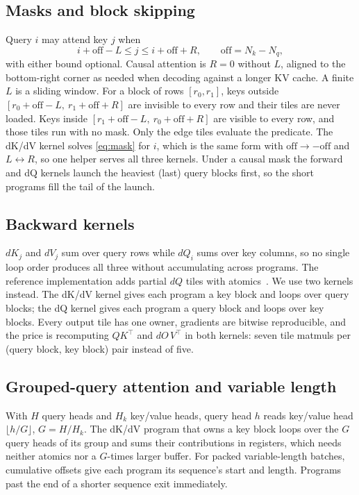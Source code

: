 \documentclass[10pt,twocolumn,letterpaper]{article}
\begin{document}
\subsection{Masks and block skipping}
Query $i$ may attend key $j$ when
\begin{equation}
i + \mathrm{off} - L \le j \le i + \mathrm{off} + R, \qquad \mathrm{off} = N_k - N_q,
\label{eq:mask}
\end{equation}
with either bound optional. Causal attention is $R = 0$ without $L$, aligned
to the bottom-right corner as needed when decoding against a longer KV cache.
A finite $L$ is a sliding window. For a block of rows $[r_0, r_1]$, keys
outside $[r_0 + \mathrm{off} - L,\ r_1 + \mathrm{off} + R]$ are invisible to
every row and their tiles are never loaded. Keys inside
$[r_1 + \mathrm{off} - L,\ r_0 + \mathrm{off} + R]$ are visible to every row,
and those tiles run with no mask. Only the edge tiles evaluate the predicate.
The dK/dV kernel solves \cref{eq:mask} for $i$, which is the same form with
$\mathrm{off} \to -\mathrm{off}$ and $L \leftrightarrow R$, so one helper
serves all three kernels. Under a causal mask the forward and dQ kernels
launch the heaviest (last) query blocks first, so the short programs fill the
tail of the launch.

\subsection{Backward kernels}
$dK_j$ and $dV_j$ sum over query rows while $dQ_i$ sums over key columns, so
no single loop order produces all three without accumulating across programs.
The reference implementation adds partial $dQ$ tiles with
atomics~\cite{dao2024flashattention2}. We use two kernels instead. The dK/dV
kernel gives each program a key block and loops over query blocks; the dQ
kernel gives each program a query block and loops over key blocks. Every
output tile has one owner, gradients are bitwise reproducible, and the price
is recomputing $QK^\top$ and $dO\,V^\top$ in both kernels: seven tile matmuls
per (query block, key block) pair instead of five.

\subsection{Grouped-query attention and variable length}
With $H$ query heads and $H_k$ key/value heads, query head $h$ reads
key/value head $\lfloor h / G \rfloor$, $G = H/H_k$. The dK/dV program that
owns a key block loops over the $G$ query heads of its group and sums their
contributions in registers, which needs neither atomics nor a $G$-times larger
buffer. For packed variable-length batches, cumulative offsets give each
program its sequence's start and length. Programs past the end of a shorter
sequence exit immediately.
\end{document}
